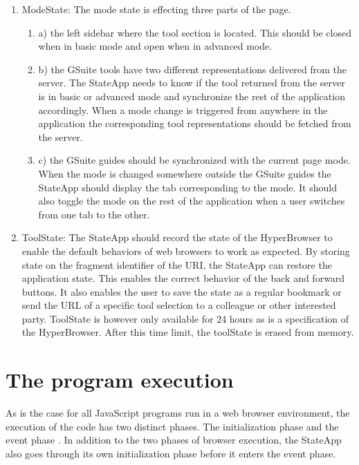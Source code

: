 \documentclass[english]{ifimaster}
\begin{document}
\begin{enumerate}
\item{ModeState:}
 The mode state is effecting three parts of the page. 
\begin{enumerate}
\item a) the left sidebar where the tool section is located. This should be closed when in basic mode and open when in advanced mode. 

\item b) the GSuite tools have two different representations delivered from the server. The StateApp needs to know if the tool returned from the server is in basic or advanced mode and synchronize the rest of the application accordingly. When a mode change is triggered from anywhere in the application the corresponding tool representations should be fetched from the server.

\item c) the GSuite guides should be synchronized with the current page mode. When the mode is changed somewhere outside the GSuite guides the StateApp should display the tab corresponding to the mode. It should also toggle the mode on the rest of the application when a user switches from one tab to the other. 
\end{enumerate}
\item{ToolState:}
The StateApp should record the state of the HyperBrowser to enable the default behaviors of web browsers to work as expected. By storing state on the fragment identifier of the URI, the StateApp can restore the application state. This enables the correct behavior of the back and forward buttons. It also enables the user to save the state as a regular bookmark or send the URL of a specific tool selection to a colleague or other interested party. ToolState is however only available for 24 hours as is a specification of the HyperBrowser. After this time limit, the toolState is erased from memory.
\end{enumerate}


\section{The program execution}
As is the case for all JavaScript programs run in a web browser environment, the execution of the code has two distinct phases. The initialization phase and the event phase \parencite[p.317]{flanagan}. In addition to the two phases of browser execution, the StateApp also goes through its own initialization phase before it enters the event phase.
\end{document}
